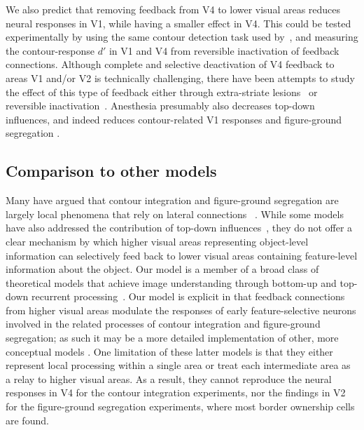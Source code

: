  We also predict that removing feedback
 from V4 to lower visual areas
reduces neural responses in V1,
 while having a smaller effect in V4.
This could be tested experimentally by using the same contour
detection task used by~\cite{Chen_etal14}, and measuring the
contour-response $d'$ in V1 and V4 from reversible inactivation of
feedback connections. Although complete and selective deactivation of
V4
%
feedback to areas V1 and/or V2 is technically
 challenging, there have been attempts to study the effect of 
 this type of
 feedback
either through extra-striate lesions~\citep{Super_Lamme07} or
reversible inactivation~\citep{Jansen_etal12}.
Anesthesia presumably also decreases top-down influences, and indeed
reduces contour-related V1 responses \cite{Li_etal08a} and
figure-ground segregation \citep{Lamme_etal98}.

\subsection{Comparison to other models}
Many have argued that contour integration
 and figure-ground segregation
are 
largely
%
 local phenomena
that 
rely on
%
 lateral connections
~\citep{Grossberg94, Grossberg97, Li98, Zhaoping05,
  Piech_etal13}. 
  While some models have also addressed the contribution of top-down influences~\citep{Li98,Piech_etal13},
  they do not offer a clear mechanism by which higher visual areas representing object-level information can selectively feed back to lower visual areas containing feature-level information about the object.
Our model is a member of a broad class of theoretical models that
achieve image understanding through bottom-up and top-down recurrent
processing~\citep{Ullman84,Hochstein_Ahissar02,Roelfsema_06,Epshtein_etal08}.
Our model is explicit in that feedback connections from higher visual areas
modulate the responses of early feature-selective neurons involved in
the related processes of contour integration and figure-ground
segregation; as such it may be a more detailed implementation of
other, more conceptual models \citep{Piech_etal13,Poort_etal12}.
One limitation of these 
latter models is that they either represent local
processing within a single area or treat each intermediate area as a
relay to higher visual areas. As a result, they cannot reproduce the
neural responses in V4 for the contour integration experiments, nor
the findings in V2 for the figure-ground segregation experiments,
where most border ownership cells are found.

